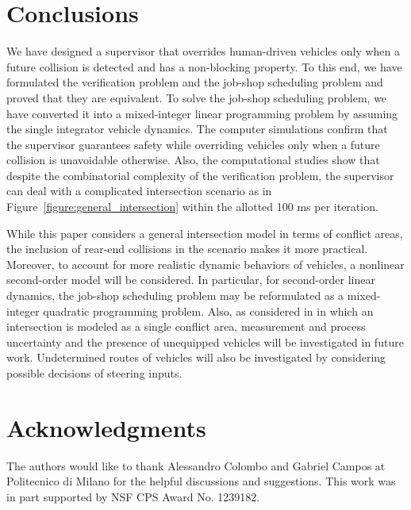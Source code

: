\documentclass{sig-alternate}
\begin{document}
\section{Conclusions}\label{section:conclusions}
We have designed a supervisor that overrides human-driven vehicles only when a future collision is detected and has a non-blocking property. To this end, we have formulated the verification problem and the job-shop scheduling problem and proved that they are equivalent. To solve the job-shop scheduling problem, we have converted it into a mixed-integer linear programming problem by assuming the single integrator vehicle dynamics. The computer simulations confirm that the supervisor guarantees safety while overriding vehicles only when a future collision is unavoidable otherwise. Also, the computational studies show that despite the combinatorial complexity of the verification problem, the supervisor can deal with a complicated intersection scenario as in Figure~\ref{figure:general_intersection} within the allotted 100 ms per iteration. 

While this paper considers a general intersection model in terms of conflict areas, the inclusion of rear-end collisions in the scenario makes it more practical. Moreover, to account for more realistic dynamic behaviors of vehicles, a nonlinear second-order model will be considered. In particular, for second-order linear dynamics, the job-shop scheduling problem may be reformulated as a mixed-integer quadratic programming problem. Also, as considered in \cite{bruni_robust_2013,ahn_supervisory_2014,ahn_experimental_2015} in which an intersection is modeled as a single conflict area, measurement and process uncertainty and the presence of unequipped vehicles will be investigated in future work. Undetermined routes of vehicles will also be investigated by considering possible decisions of steering inputs.

\section{Acknowledgments}
The authors would like to thank Alessandro Colombo and Gabriel Campos at Politecnico di Milano for the helpful discussions and suggestions. This work was in part supported by NSF CPS Award No. 1239182.




 
\end{document}
